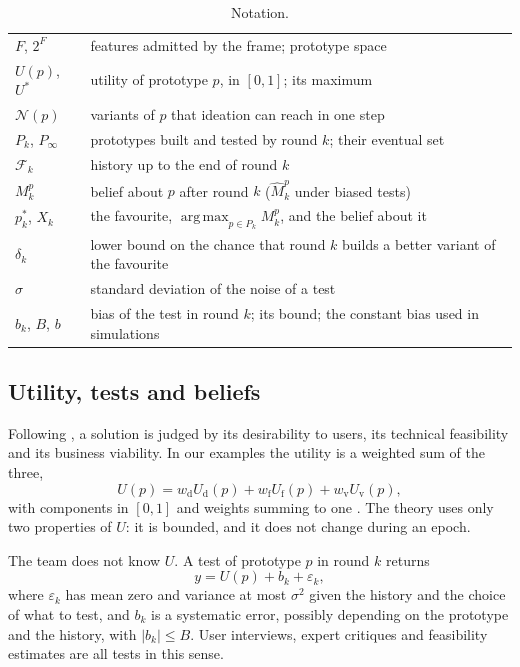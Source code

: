 \documentclass[preprint,review,11pt,authoryear]{elsarticle}
\DeclareMathOperator*{\argmax}{arg\,max}
\newcommand{\filt}{\mathcal{F}}
\newcommand{\Nb}{\mathcal{N}}
\newcommand{\Pk}{P_k}
\theoremstyle{definition}
\begin{document}
\begin{table}[t]
\caption{Notation.}
\label{tab:notation}
\centering\small
\begin{tabularx}{\textwidth}{@{}lX@{}}
\toprule
$F$, $2^F$ & features admitted by the frame; prototype space\\
$U(p)$, $U^*$ & utility of prototype $p$, in $[0,1]$; its maximum\\
$\Nb(p)$ & variants of $p$ that ideation can reach in one step\\
$\Pk$, $P_\infty$ & prototypes built and tested by round $k$; their eventual set\\
$\filt_k$ & history up to the end of round $k$\\
$M^p_k$ & belief about $p$ after round $k$ ($\widehat M^p_k$ under biased tests)\\
$p^*_k$, $X_k$ & the favourite, $\argmax_{p\in \Pk}M^p_k$, and the belief about it\\
$\delta_k$ & lower bound on the chance that round $k$ builds a better variant of the favourite\\
$\sigma$ & standard deviation of the noise of a test\\
$b_k$, $B$, $b$ & bias of the test in round $k$; its bound; the constant bias used in simulations\\
\bottomrule
\end{tabularx}
\end{table}

\subsection{Utility, tests and beliefs}

Following \citet{brown2009}, a solution is judged by its desirability to users, its technical feasibility and its business viability. In our examples the utility is a weighted sum of the three,
\begin{equation}
\label{eq:utility}
U(p)=w_{\mathrm d}U_{\mathrm d}(p)+w_{\mathrm f}U_{\mathrm f}(p)+w_{\mathrm v}U_{\mathrm v}(p),
\end{equation}
with components in $[0,1]$ and weights summing to one \citep{keeney1976}. The theory uses only two properties of $U$: it is bounded, and it does not change during an epoch.

The team does not know $U$. A test of prototype $p$ in round $k$ returns
\begin{equation}
\label{eq:test}
y=U(p)+b_k+\varepsilon_k ,
\end{equation}
where $\varepsilon_k$ has mean zero and variance at most $\sigma^2$ given the history and the choice of what to test, and $b_k$ is a systematic error, possibly depending on the prototype and the history, with $|b_k|\le B$. User interviews, expert critiques and feasibility estimates are all tests in this sense.
\end{document}
